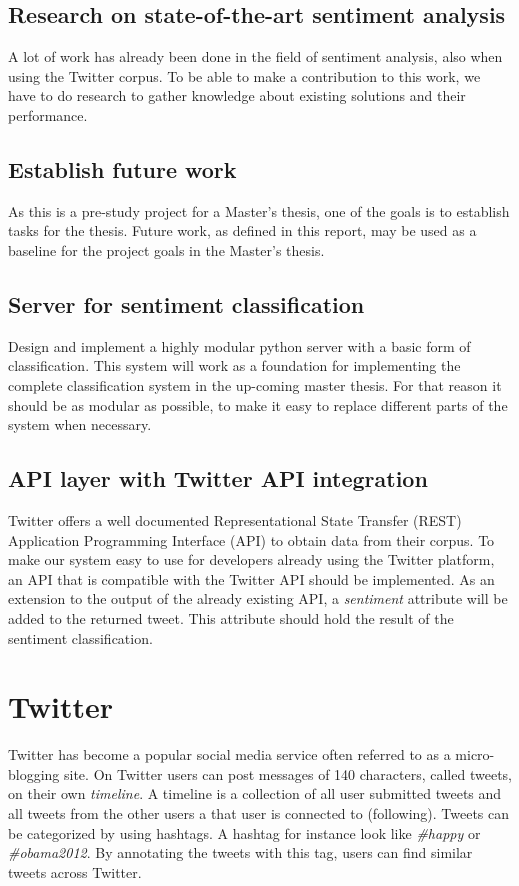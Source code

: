 	\subsection{Research on state-of-the-art sentiment analysis}
	A lot of work has already been done in the field of sentiment analysis, also when using the Twitter corpus. To be able to make a contribution to this work, we have to do research to gather knowledge about existing solutions and their performance.
	
	\subsection{Establish future work}
	As this is a pre-study project for a Master's thesis, one of the goals is to establish tasks for the thesis. Future work, as defined in this report, may be used as a baseline for the project goals in the Master's thesis.
	
	\subsection{Server for sentiment classification}
	Design and implement a highly modular python server with a basic form of classification. This system will work as a foundation for implementing the complete classification system in the up-coming master thesis. For that reason it should be as modular as possible, to make it easy to replace different parts of the system when necessary.

	\subsection{API layer with Twitter API integration}
	Twitter offers a well documented Representational State Transfer (REST) Application Programming Interface (API) to obtain data from their corpus. To make our system easy to use for developers already using the Twitter platform, an API that is compatible with the Twitter API should be implemented. As an extension to the output of the already existing API, a \emph{sentiment} attribute will be added to the returned tweet. This attribute should hold the result of the sentiment classification.
	

\section{Twitter}

Twitter has become a popular social media service often referred to as a micro-blogging site. On Twitter users can post messages of 140 characters, called tweets, on their own \emph{timeline}. A timeline is a collection of all user submitted tweets and all tweets from the other users a that user is connected to (following). Tweets can be categorized by using hashtags. A hashtag for instance look like \emph{\#happy} or \emph{\#obama2012}. By annotating the tweets with this tag, users can find similar tweets across Twitter.

